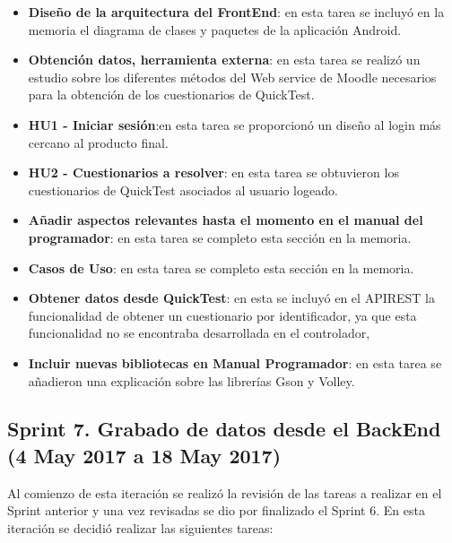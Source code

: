 \begin{itemize}

	\item \textbf{Diseño de la arquitectura del FrontEnd}: en esta tarea se incluyó en la memoria el diagrama de clases y paquetes de la aplicación Android.
	\item \textbf{Obtención datos, herramienta externa}: en esta tarea se realizó un estudio sobre los diferentes métodos del Web service de Moodle necesarios para la obtención de los cuestionarios de QuickTest.
	\item \textbf{HU1 - Iniciar sesión}:en esta tarea se proporcionó un diseño al login más cercano al producto final.
	\item \textbf{HU2 - Cuestionarios a resolver}: en esta tarea se obtuvieron los cuestionarios de QuickTest asociados al usuario logeado.
	\item \textbf{Añadir aspectos relevantes hasta el momento en el manual del programador}: en esta tarea se completo esta sección en la memoria.
	\item \textbf{Casos de Uso}: en esta tarea se completo esta sección en la memoria.
	\item \textbf{Obtener datos desde QuickTest}: en esta se incluyó en el APIREST la funcionalidad de obtener un cuestionario por identificador, ya que esta funcionalidad no se encontraba desarrollada en el controlador,
	\item \textbf{Incluir nuevas bibliotecas en Manual Programador}: en esta tarea se añadieron una explicación sobre las librerías Gson y Volley.


\end{itemize}


\subsection{Sprint 7. Grabado de datos desde el BackEnd (4 May 2017 a 18 May 2017)}

Al comienzo de esta iteración se realizó la revisión de las tareas a realizar en el Sprint anterior y una vez revisadas se dio por finalizado el Sprint 6. 
En esta iteración se decidió realizar las siguientes tareas:

